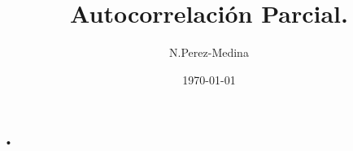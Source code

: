 \documentclass[11pt]{beamer}
\author{N.Perez-Medina}
\title{Autocorrelación Parcial.}
\institute{FING - UACH}
\date{\today}
\begin{document}
\begin{frame}
\titlepage
\end{frame}

\begin{frame}
\tableofcontents
\end{frame}

\begin{frame}{•}

\end{frame}
\end{document}
